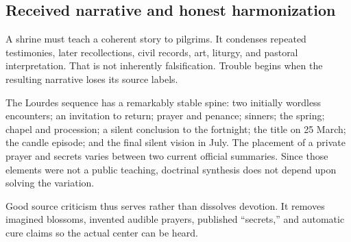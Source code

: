\subsection{Received narrative and honest harmonization}

A shrine must teach a coherent story to pilgrims. It condenses repeated testimonies, later recollections, civil records, art, liturgy, and pastoral interpretation. That is not inherently falsification. Trouble begins when the resulting narrative loses its source labels.

The Lourdes sequence has a remarkably stable spine: two initially wordless encounters; an invitation to return; prayer and penance; sinners; the spring; chapel and procession; a silent conclusion to the fortnight; the title on 25 March; the candle episode; and the final silent vision in July. The placement of a private prayer and secrets varies between two current official summaries. Since those elements were not a public teaching, doctrinal synthesis does not depend upon solving the variation.

Good source criticism thus serves rather than dissolves devotion. It removes imagined blossoms, invented audible prayers, published “secrets,” and automatic cure claims so the actual center can be heard.
